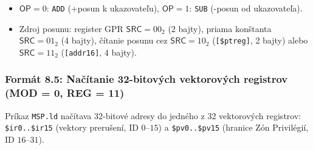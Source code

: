 \documentclass[11pt,a4paper]{article}
\newcommand{\field}[1]{\textsf{#1}}
\begin{document}
\begin{center}
\end{center}

\begin{itemize}
  \item $\field{OP} = 0$: \texttt{ADD} (+posun k ukazovateľu), $\field{OP} = 1$: \texttt{SUB} (-posun od ukazovateľa).
  \item Zdroj posunu: register GPR $\field{SRC}=00_2$ (2 bajty), priama konštanta $\field{SRC}=01_2$ (4 bajty), čítanie posunu cez $\field{SRC}=10_2$ (\texttt{[\$ptreg]}, 2 bajty) alebo $\field{SRC}=11_2$ (\texttt{[addr16]}, 4 bajty).
\end{itemize}

\subsubsection{Formát 8.5: Načítanie 32-bitových vektorových registrov (MOD = 0, REG = 11)}
Príkaz \texttt{MSP.ld} načítava 32-bitové adresy do jedného z 32 vektorových registrov: \texttt{\$ir0..\$ir15} (vektory prerušení, ID $0$--$15$) a \texttt{\$pv0..\$pv15} (hranice Zón Privilégií, ID $16$--$31$).
\end{document}
